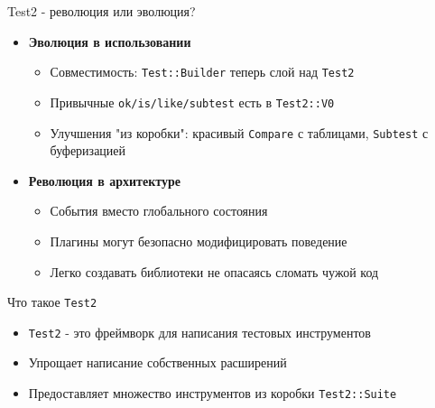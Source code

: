 \begin{frame}[fragile]{Test2 - революция или эволюция?}
    \begin{itemize}
        \item \textbf{Эволюция в использовании}
        \begin{itemize}
            \item Совместимость: \texttt{Test::Builder} теперь слой над \texttt{Test2}
            \vspace{0.25em}
            \item Привычные \texttt{ok/is/like/subtest} есть в \texttt{Test2::V0}
            \vspace{0.25em}
            \item Улучшения "из коробки": красивый \texttt{Compare} с таблицами, \texttt{Subtest} с буферизацией
        \end{itemize}
        \vspace{0.5em}
        \item \textbf{Революция в архитектуре}
        \begin{itemize}
            \item События вместо глобального состояния
            \vspace{0.25em}
            \item Плагины могут безопасно модифицировать поведение
            \vspace{0.25em}
            \item Легко создавать библиотеки не опасаясь сломать чужой код
        \end{itemize}
    \end{itemize}
\end{frame}

\begin{frame}[fragile]{Что такое \texttt{Test2}}
    \begin{itemize}
        \item \texttt{Test2} - это фреймворк для написания тестовых инструментов
        \vspace{0.25em}
        \item Упрощает написание собственных расширений
        \vspace{0.25em}
        \item Предоставляет множество инструментов из коробки \texttt{Test2::Suite}
    \end{itemize}
\end{frame}

